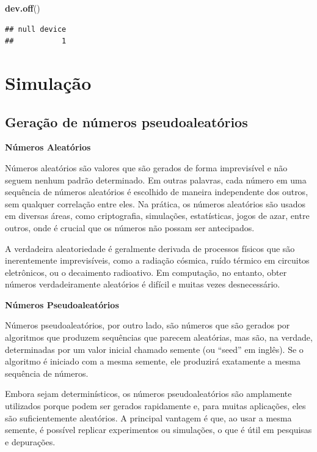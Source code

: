 \documentclass[
]{book}
\newenvironment{Shaded}{\begin{snugshade}}{\end{snugshade}}
\newcommand{\FunctionTok}[1]{\textcolor[rgb]{0.13,0.29,0.53}{\textbf{#1}}}
\newcommand{\NormalTok}[1]{#1}
\theoremstyle{definition}
\theoremstyle{definition}
\theoremstyle{definition}
\theoremstyle{definition}
\theoremstyle{remark}
\begin{document}
\begin{Shaded}
\begin{Highlighting}[]
\FunctionTok{dev.off}\NormalTok{()}
\end{Highlighting}
\end{Shaded}

\begin{verbatim}
## null device 
##           1
\end{verbatim}

\chapter{Simulação}\label{simulauxe7uxe3o}

\section{Geração de números pseudoaleatórios}\label{gerauxe7uxe3o-de-nuxfameros-pseudoaleatuxf3rios}

\textbf{Números Aleatórios}

Números aleatórios são valores que são gerados de forma imprevisível e não seguem nenhum padrão determinado. Em outras palavras, cada número em uma sequência de números aleatórios é escolhido de maneira independente dos outros, sem qualquer correlação entre eles. Na prática, os números aleatórios são usados em diversas áreas, como criptografia, simulações, estatísticas, jogos de azar, entre outros, onde é crucial que os números não possam ser antecipados.

A verdadeira aleatoriedade é geralmente derivada de processos físicos que são inerentemente imprevisíveis, como a radiação cósmica, ruído térmico em circuitos eletrônicos, ou o decaimento radioativo. Em computação, no entanto, obter números verdadeiramente aleatórios é difícil e muitas vezes desnecessário.

\textbf{Números Pseudoaleatórios}

Números pseudoaleatórios, por outro lado, são números que são gerados por algoritmos que produzem sequências que parecem aleatórias, mas são, na verdade, determinadas por um valor inicial chamado semente (ou ``seed'' em inglês). Se o algoritmo é iniciado com a mesma semente, ele produzirá exatamente a mesma sequência de números.

Embora sejam determinísticos, os números pseudoaleatórios são amplamente utilizados porque podem ser gerados rapidamente e, para muitas aplicações, eles são suficientemente aleatórios. A principal vantagem é que, ao usar a mesma semente, é possível replicar experimentos ou simulações, o que é útil em pesquisas e depurações.
\end{document}
